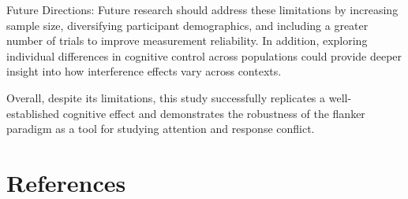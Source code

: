 \documentclass[
  authoryear,
  preprint]{elsarticle}
\begin{document}
Future Directions: Future research should address these limitations by
increasing sample size, diversifying participant demographics, and
including a greater number of trials to improve measurement reliability.
In addition, exploring individual differences in cognitive control
across populations could provide deeper insight into how interference
effects vary across contexts.

Overall, despite its limitations, this study successfully replicates a
well-established cognitive effect and demonstrates the robustness of the
flanker paradigm as a tool for studying attention and response conflict.

\section*{References}\label{references}

\renewcommand{\bibsection}{}

\end{document}
